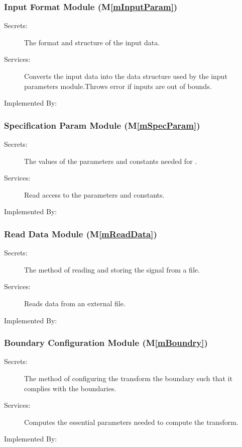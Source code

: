 \documentclass[12pt, titlepage]{article}
\newcommand{\mref}[1]{M\ref{#1}}
\begin{document}
\subsubsection{Input Format Module (\mref{mInputParam})}

\begin{description}
\item[Secrets:]The format and structure of the input data.
\item[Services:]Converts the input data into the data structure used by the
  input parameters module.Throws error if inputs are out of bounds.
\item[Implemented By:] \progname{}
\end{description}

\subsubsection{Specification Param Module (\mref{mSpecParam})}

\begin{description}
\item[Secrets:]The values of the parameters and constants needed for \progname{}.
\item[Services:]Read access to the parameters and constants.
\item[Implemented By:] \progname{}
\end{description}

\subsubsection{Read Data Module (\mref{mReadData})}

\begin{description}
\item[Secrets:]The method of reading and storing the signal from a file.
\item[Services:]Reads data from an external file.
\item[Implemented By:] \progname{}
\end{description}


\subsubsection{Boundary Configuration Module (\mref{mBoundry})}

\begin{description}
\item[Secrets:]The method of configuring the transform the boundary such that it complies with the boundaries.
\item[Services:]Computes the essential parameters needed to compute the transform.
\item[Implemented By:] \progname{}
\end{description}
\end{document}
